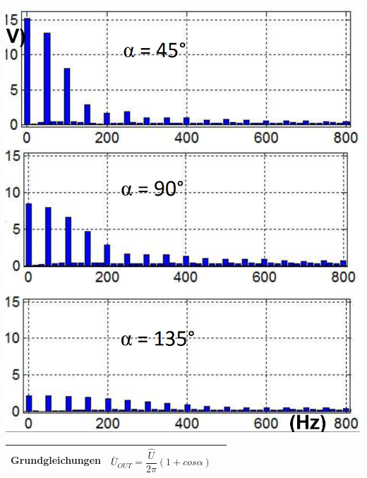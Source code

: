 \begin{minipage}{0.25\linewidth}
    \includegraphics[width=\linewidth]{images/M1COW} 
\end{minipage}
\newline

\begin{longtable}{| p{} | p{} | p{} |} %
    \hline
    \textbf{Grundgleichungen}&
    \[ \bar{U}_{OUT} = \dfrac{\hat{U}}{2\pi}(1+cos \alpha)\]&\\
    \hline   
\end{longtable}


\clearpage

